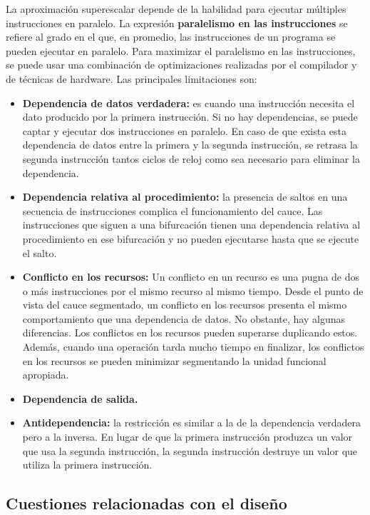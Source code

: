 La aproximación superescalar depende de la habilidad para ejecutar múltiples instrucciones en paralelo. La expresión \textbf{paralelismo en las instrucciones} se refiere al grado en el que, en promedio, las instrucciones de un programa se pueden ejecutar en paralelo. Para maximizar el paralelismo en las instrucciones, se puede usar una combinación de optimizaciones realizadas por el compilador y de técnicas de hardware. Las principales limitaciones son:

\begin{itemize}
  \item \textbf{Dependencia de datos verdadera:} es cuando una instrucción necesita el dato producido por la primera instrucción. Si no hay dependencias, se puede captar y ejecutar dos instrucciones en paralelo. En caso de que exista esta dependencia de datos entre la primera y la segunda instrucción, se retrasa la segunda instrucción tantos ciclos de reloj como sea necesario para eliminar la dependencia.
  \item \textbf{Dependencia relativa al procedimiento:} la presencia de saltos en una secuencia de instrucciones complica el funcionamiento del cauce. Las instrucciones que siguen a una bifurcación tienen una dependencia relativa al procedimiento en ese bifurcación y no pueden ejecutarse hasta que se ejecute el salto.
  \item \textbf{Conflicto en los recursos:} Un conflicto en un recurso es una pugna de dos o más instrucciones por el mismo recurso al mismo tiempo. Desde el punto de vista del cauce segmentado, un conflicto en los recursos presenta el mismo comportamiento que una dependencia de datos. No obstante, hay algunas diferencias. Los conflictos en los recursos pueden superarse duplicando estos. Además, cuando una operación tarda mucho tiempo en finalizar, los conflictos en los recursos se pueden minimizar segmentando la unidad funcional apropiada.
  \item \textbf{Dependencia de salida.}
  \item \textbf{Antidependencia:} la restricción es similar a la de la dependencia verdadera pero a la inversa. En lugar de que la primera instrucción produzca un valor que usa la segunda instrucción, la segunda instrucción destruye un valor que utiliza la primera instrucción.
\end{itemize}

\subsection{Cuestiones relacionadas con el diseño}

